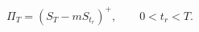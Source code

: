 \documentclass{equation-sheet}
\begin{document}
\begin{equation*}
\Pi_T = \left(S_T-mS_{t_r}\right)^{+},
\qquad 0<t_r<T.
\end{equation*}
\end{document}
